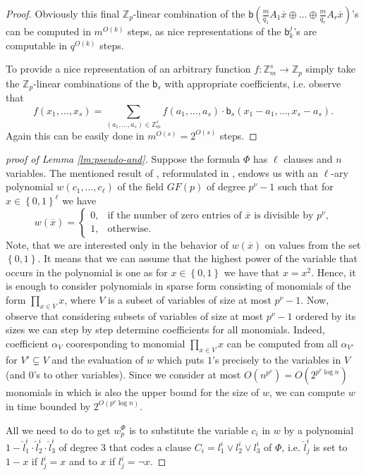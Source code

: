 \documentclass[11pt,a4paper]{amsart}
\newcommand{\set}[1]{{\left\{ {#1} \right\} }}
\renewcommand{\o}[1]{\overline {#1}}
\newcommand{\map}{\longrightarrow}
\newcommand{\z}{\mathbb{Z}}
\renewcommand{\b}{\textsf{b}}
\begin{document}
\begin{proof}
Obviously this final $\z_p$-linear combination of the
$\b(\frac{m}{q_1} A_1\o x \oplus\ldots\oplus\frac{m}{q_r} A_r\o x)$'s
can be computed in $m^{O(k)}$ steps, as nice representations of the $\b_k^j$'s
are computable in $q^{O(k)}$ steps.

\medskip
To provide a nice representation of an arbitrary function $f: \z_m^s \map \z_p$
simply take the $\z_p$-linear combinations of the $\b_s$ with appropriate coefficients,
i.e. observe that
\[
f(x_1,\ldots,x_s) =
\sum_{(a_1,\ldots,a_s)\in\z_m^s} f(a_1,\ldots,a_s)\cdot \b_s(x_1-a_1,\ldots,x_s-a_s).
\]
Again this can be easily done in $m^{O(s)} = 2^{O(s)}$ steps.
\end{proof}


\begin{proof}[proof of Lemma \ref{lm:pseudo-and}]
Suppose the formula $\Phi$ has $\ell$ clauses and $n$ variables.
The mentioned result of \cite{BarringtonBR94}, reformulated in \cite[Fact 3.4]{idziakKK22LICS},
endows us with an $\ell$-ary polynomial $w(c_1,\ldots,c_\ell)$ of the field $GF(p)$ of degree $p^{\nu}-1$
such that for $x\in\set{0,1}^\ell$ we have
\[
w(\o x) =
\left\{
\begin{array}{ll}
0, &\mbox{if the number of zero entries of $\overline{x}$ is divisible by $p^\nu$,}\\
1, &\mbox{otherwise.}
\end{array}
\right.
\]
Note, that we are interested only in the behavior of $w(\o x)$ on values from the set $\set{0,1}$. It means that we can assume that the highest power of the variable that occurs in the polynomial is one as for $x\in\set{0,1}$ we have that $x=x^2$. Hence, it is enough to consider polynomials in sparse form consisting of monomials of the form $\prod_{x\in V} x$, where $V$ is a subset of variables of size at most $p^\nu-1$. Now, observe that considering subsets of variables of size at most $p^\nu-1$ ordered by its sizes we can step by step determine coefficients for all monomials.
Indeed, coefficient $\alpha_V$ cooresponding to monomial $\prod_{x\in V} x$  can be computed from all $\alpha_{V'}$ for $V' \subsetneq V$ and the evaluation of $w$ which puts $1$'s precisely to the variables in $V$ (and $0$'s to other variables).
Since we consider at most $O(n^{p^\nu})=O(2^{p^\nu\log{n}})$ monomials in  which is also the upper bound for the size of $w$, we can compute $w$ in time bounded by $2^{O(p^\nu\log{n})}$.



All we need to do to get $w^\Phi_{p}$
is to substitute the variable $c_i$ in $w$ by a polynomial
$1-\hat{l}^i_1\cdot\hat{l}^i_2\cdot\hat{l}^i_3$ of degree $3$
that codes a clause $C_i=l^i_1\vee l^i_2\vee l^i_3$ of $\Phi$,
i.e. $\hat{l}^i_j$ is set to $1-x$ if $l^i_j=x$ and to $x$ if $l^i_j=\neg x$.
\end{proof}
\end{document}
